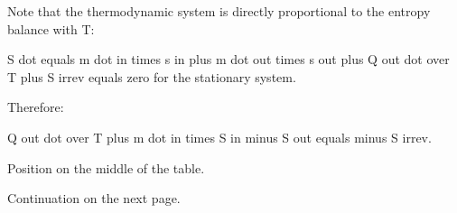 Note that the thermodynamic system is directly proportional to the entropy balance with T:

S dot equals m dot in times s in plus m dot out times s out plus Q out dot over T plus S irrev equals zero for the stationary system.

Therefore:

Q out dot over T plus m dot in times S in minus S out equals minus S irrev.

Position on the middle of the table.

Continuation on the next page.